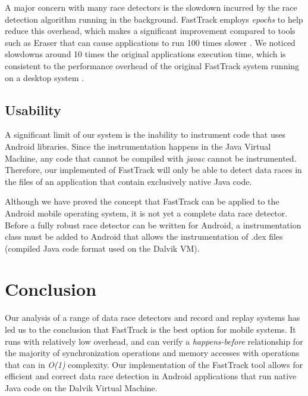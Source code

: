 \documentclass{acm_proc_article-sp}
\begin{document}
A major concern with many race detectors is the slowdown incurred by the race detection algorithm running in the background. FastTrack employs \emph{epochs} to help reduce this overhead, which makes a significant improvement compared to tools such as Eraser that can cause applications to run 100 times slower \cite{Savage1997}. We noticed slowdowns around 10 times the original applications execution time, which is consistent to the performance overhead of the original FastTrack system running on a desktop system \cite{Flanagan2010}.

\subsection{Usability}
A significant limit of our system is the inability to instrument code that uses Android libraries. Since the instrumentation happens in the Java Virtual Machine, any code that cannot be compiled with \emph{javac} cannot be instrumented. Therefore, our implemented of FastTrack will only be able to detect data races in the files of an application that contain exclusively native Java code.

Although we have proved the concept that FastTrack can be applied to the Android mobile operating system, it is not yet a complete data race detector. Before a fully robust race detector can be written for Android, a instrumentation class must be added to Android that allows the instrumentation of .dex files (compiled Java code format used on the Dalvik VM).


\section{Conclusion}
Our analysis of a range of data race detectors and record and replay systems has led us to the conclusion that FastTrack is the best option for mobile systems. It runs with relatively low overhead, and can verify a \emph{happens-before} relationship for the majority of synchronization operations and memory accesses with operations that can in \emph{O(1)} complexity. Our implementation of the FastTrack tool allows for efficient and correct data race detection in Android applications that run native Java code on the Dalvik Virtual Machine.



\end{document}
